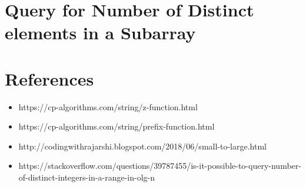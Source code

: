 \documentclass{article}
\begin{document}
    \section{Query for Number of Distinct elements in a Subarray}

    \section{References}

    \begin{itemize}
        \item https://cp-algorithms.com/string/z-function.html
        \item https://cp-algorithms.com/string/prefix-function.html
        \item http://codingwithrajarshi.blogspot.com/2018/06/small-to-large.html
        \item https://stackoverflow.com/questions/39787455/is-it-possible-to-query-number-of-distinct-integers-in-a-range-in-olg-n
    \end{itemize}
\end{document}

